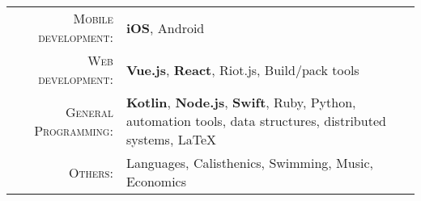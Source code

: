 %
%
%

\begin{tabular}{rl}
    \textsc{Mobile development:} & \textbf{iOS}, Android \\
    \textsc{Web development:} & \textbf{Vue.js}, \textbf{React}, Riot.js, Build/pack tools \\ 
    \textsc{General Programming:} & \textbf{Kotlin}, \textbf{Node.js}, \textbf{Swift}, Ruby, Python, automation tools, data structures, distributed systems, LaTeX \\ 
    \textsc{Others:} & Languages, Calisthenics, Swimming, Music, Economics \\
\end{tabular}
